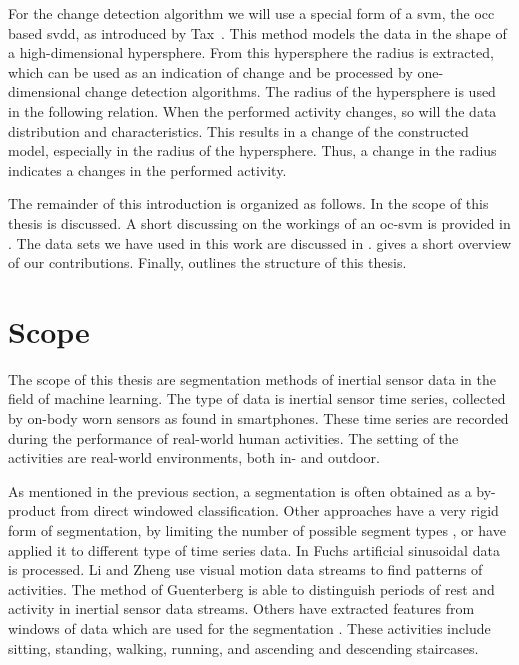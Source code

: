 For the change detection algorithm we will use a special form of a \gls{svm}, the \gls{occ} based \gls{svdd}, as introduced by Tax~\cite{tax2001one}.
This method models the data in the shape of a high-dimensional hypersphere.
From this hypersphere the radius is extracted, which can be used as an indication of change and be processed by one-dimensional change detection algorithms.
The radius of the hypersphere is used in the following relation.
When the performed activity changes, so will the data distribution and characteristics.
This results in a change of the constructed model, especially in the radius of the hypersphere.
Thus, a change in the radius indicates a changes in the performed activity.

The remainder of this introduction is organized as follows.
In  the scope of this thesis is discussed.
A short discussing on the workings of an \acrlong{oc-svm} is provided in .
The data sets we have used in this work are discussed in .
 gives a short overview of our contributions.
Finally,  outlines the structure of this thesis.

\section{Scope}\label{sec:intro_scope}
The scope of this thesis are segmentation methods of inertial sensor data in the field of machine learning.
The type of data is inertial sensor time series, collected by on-body worn sensors as found in smartphones.
These time series are recorded during the performance of real-world human activities.
The setting of the activities are real-world environments, both in- and outdoor.

As mentioned in the previous section, a segmentation is often obtained as a by-product from direct windowed classification.
Other approaches have a very rigid form of segmentation, \eg by limiting the number of possible segment types \cite{himberg2001time,chamroukhi2013joint}, or have applied it to different type of time series data.
In Fuchs \etal \cite{fuchs2010online} artificial sinusoidal data is processed.
Li and Zheng \cite{li2007segmentation} use visual motion data streams to find patterns of activities.
The method of Guenterberg \etal \cite{guenterberg2009automatic} is able to distinguish periods of rest and activity in inertial sensor data streams.
Others have extracted features from windows of data which are used for the segmentation \cite{guo2012adaptive}.
These activities include sitting, standing, walking, running, and ascending and descending staircases.

